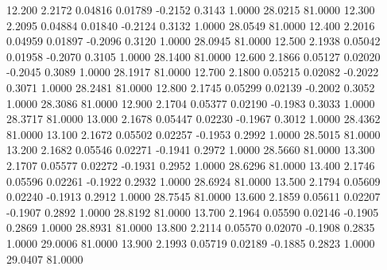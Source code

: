   12.200   2.2172   0.04816   0.01789  -0.2152   0.3143   1.0000  28.0215  81.0000
  12.300   2.2095   0.04884   0.01840  -0.2124   0.3132   1.0000  28.0549  81.0000
  12.400   2.2016   0.04959   0.01897  -0.2096   0.3120   1.0000  28.0945  81.0000
  12.500   2.1938   0.05042   0.01958  -0.2070   0.3105   1.0000  28.1400  81.0000
  12.600   2.1866   0.05127   0.02020  -0.2045   0.3089   1.0000  28.1917  81.0000
  12.700   2.1800   0.05215   0.02082  -0.2022   0.3071   1.0000  28.2481  81.0000
  12.800   2.1745   0.05299   0.02139  -0.2002   0.3052   1.0000  28.3086  81.0000
  12.900   2.1704   0.05377   0.02190  -0.1983   0.3033   1.0000  28.3717  81.0000
  13.000   2.1678   0.05447   0.02230  -0.1967   0.3012   1.0000  28.4362  81.0000
  13.100   2.1672   0.05502   0.02257  -0.1953   0.2992   1.0000  28.5015  81.0000
  13.200   2.1682   0.05546   0.02271  -0.1941   0.2972   1.0000  28.5660  81.0000
  13.300   2.1707   0.05577   0.02272  -0.1931   0.2952   1.0000  28.6296  81.0000
  13.400   2.1746   0.05596   0.02261  -0.1922   0.2932   1.0000  28.6924  81.0000
  13.500   2.1794   0.05609   0.02240  -0.1913   0.2912   1.0000  28.7545  81.0000
  13.600   2.1859   0.05611   0.02207  -0.1907   0.2892   1.0000  28.8192  81.0000
  13.700   2.1964   0.05590   0.02146  -0.1905   0.2869   1.0000  28.8931  81.0000
  13.800   2.2114   0.05570   0.02070  -0.1908   0.2835   1.0000  29.0006  81.0000
  13.900   2.1993   0.05719   0.02189  -0.1885   0.2823   1.0000  29.0407  81.0000
